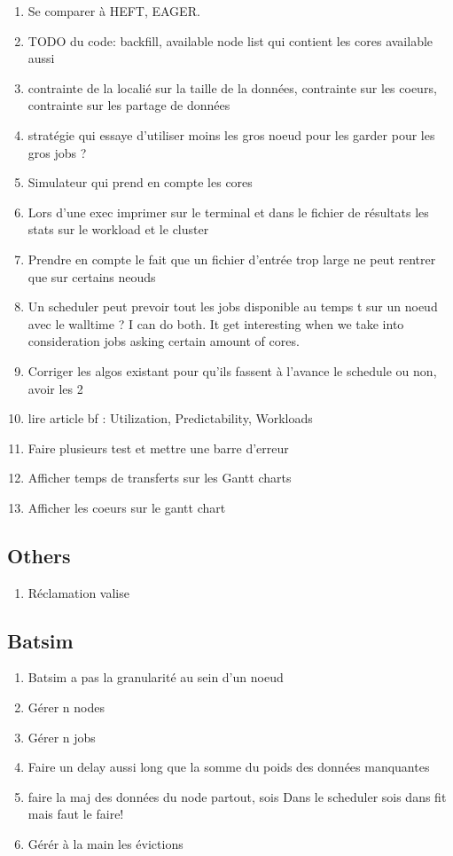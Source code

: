 \documentclass[a4paper]{article}
\begin{document}
\begin{enumerate}
			\item Se comparer à HEFT, EAGER.
			\item TODO du code: backfill, available node list qui contient les cores available aussi
			\item contrainte de la localié sur la taille de la données, contrainte sur les coeurs, contrainte sur les partage de données
			\item stratégie qui essaye d'utiliser moins les gros noeud pour les garder pour les gros jobs ?
			\item Simulateur qui prend en compte les cores
			\item Lors d'une exec imprimer sur le terminal et dans le fichier de résultats les stats sur le workload et le cluster
			\item Prendre en compte le fait que un fichier d'entrée trop large ne peut rentrer que sur certains neouds
			\item Un scheduler peut prevoir tout les jobs disponible au temps t sur un noeud avec le walltime ? I can do both. It get interesting when we take into consideration jobs asking certain amount of cores. 
			\item Corriger les algos existant pour qu'ils fassent à l'avance le schedule ou non, avoir les 2
			\item lire article bf : Utilization, Predictability, Workloads
			\item Faire plusieurs test et mettre une barre d'erreur
			\item Afficher temps de transferts sur les Gantt charts
			\item Afficher les coeurs sur le gantt chart
		\end{enumerate}
	\subsection{Others}
		\begin{enumerate}
			\item Réclamation valise
		\end{enumerate}
	\subsection{Batsim}
		\begin{enumerate}
			\item Batsim a pas la granularité au sein d'un noeud
			\item Gérer n nodes
			\item Gérer n jobs
			\item Faire un delay aussi long que la somme du poids des données manquantes
			\item faire la maj des données du node partout, sois Dans le scheduler sois dans fit mais faut le faire!
			\item Gérér à la main les évictions
		\end{enumerate}
\end{document}

